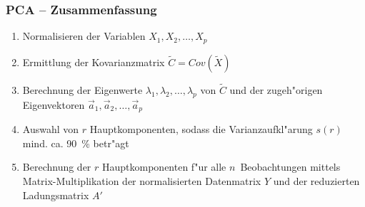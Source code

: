 
%
%
%
%







%
%
%







\begin{frame}

\frametitle{PCA -- Zusammenfassung}

\begin{enumerate}
\setlength{\itemsep}{10pt}
\item Normalisieren der Variablen $X_1,X_2,\ldots,X_p$
\item Ermittlung der Kovarianzmatrix $\tilde{C} = Cov(\tilde{X})$
\item Berechnung der Eigenwerte $\lambda_1,\lambda_2,\ldots,\lambda_p$ von $\tilde{C}$ und der zugeh"origen Eigenvektoren $\vec{a}_1,\vec{a}_2,\ldots,\vec{a}_p$
\item Auswahl von $r$ Hauptkomponenten, sodass die Varianzaufkl"arung $s(r)$ mind. ca. 90~\% betr"agt
\item Berechnung der $r$ Hauptkomponenten f"ur alle $n$~Beobachtungen mittels Matrix-Multiplikation der normalisierten Datenmatrix $Y$ und der reduzierten Ladungsmatrix $A'$
\end{enumerate}

\end{frame}







